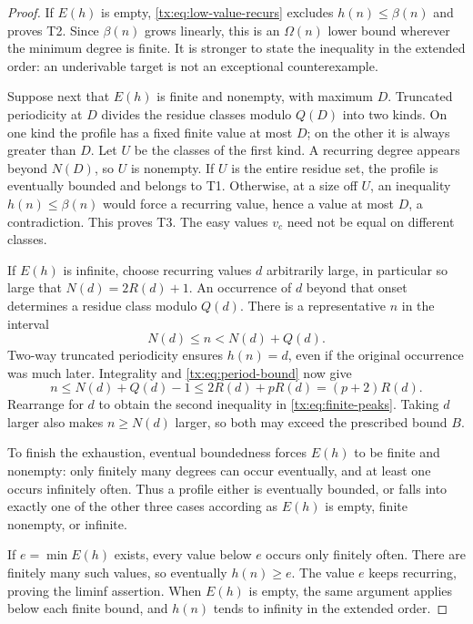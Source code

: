 \documentclass[11pt,a4paper,oneside,openany]{book}
\theoremstyle{definition}\newtheorem{definition}[theorem]{Definition}
\theoremstyle{remark}\newtheorem{remark}[theorem]{Remark}
\numberwithin{equation}{chapter}
\begin{document}
\begin{proof}
If $E(h)$ is empty, \eqref{tx:eq:low-value-recurs} excludes
$h(n)\le\beta(n)$ and proves T2. Since $\beta(n)$ grows linearly,
this is an $\Omega(n)$ lower bound wherever the minimum degree is
finite. It is stronger to state the inequality in the extended order:
an underivable target is not an exceptional counterexample.

Suppose next that $E(h)$ is finite and nonempty, with maximum $D$.
Truncated periodicity at $D$ divides the residue classes modulo $Q(D)$
into two kinds. On one kind the profile has a fixed finite value at
most $D$; on the other it is always greater than $D$. Let $U$ be the
classes of the first kind. A recurring degree appears beyond $N(D)$,
so $U$ is nonempty. If $U$ is the entire residue set, the profile is
eventually bounded and belongs to T1. Otherwise, at a size off $U$,
an inequality $h(n)\le\beta(n)$ would force a recurring value, hence
a value at most $D$, a contradiction. This proves T3. The easy values
$v_c$ need not be equal on different classes.

If $E(h)$ is infinite, choose recurring values $d$ arbitrarily large,
in particular so large that $N(d)=2R(d)+1$. An occurrence of $d$
beyond that onset determines a residue class modulo $Q(d)$. There is
a representative $n$ in the interval
\[
                           N(d)\le n<N(d)+Q(d).
\]
Two-way truncated periodicity ensures $h(n)=d$, even if the original
occurrence was much later. Integrality and \eqref{tx:eq:period-bound}
now give
\[
              n\le N(d)+Q(d)-1\le 2R(d)+pR(d)=(p+2)R(d).
\]
Rearrange for $d$ to obtain the second inequality in
\eqref{tx:eq:finite-peaks}. Taking $d$ larger also makes $n\ge N(d)$
larger, so both may exceed the prescribed bound $B$.

To finish the exhaustion, eventual boundedness forces $E(h)$ to be
finite and nonempty: only finitely many degrees can occur eventually,
and at least one occurs infinitely often. Thus a profile either is
eventually bounded, or falls into exactly one of the other three cases
according as $E(h)$ is empty, finite nonempty, or infinite.

If $e=\min E(h)$ exists, every value below $e$ occurs only finitely
often. There are finitely many such values, so eventually $h(n)\ge e$.
The value $e$ keeps recurring, proving the liminf assertion. When
$E(h)$ is empty, the same argument applies below each finite bound,
and $h(n)$ tends to infinity in the extended order.
\end{proof}
\end{document}

